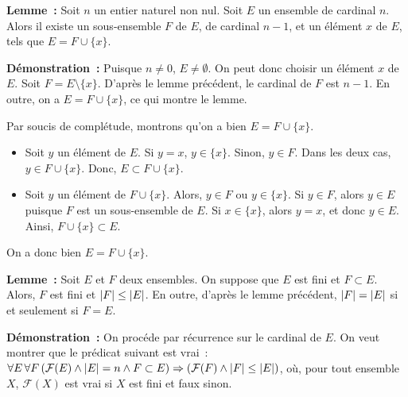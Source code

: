     \done 

\medskip

\noindent\textbf{Lemme :} Soit $n$ un entier naturel non nul. 
    Soit $E$ un ensemble de cardinal $n$. 
    Alors il existe un sous-ensemble $F$ de $E$, de cardinal $n-1$, et un élément $x$ de $E$, tels que $E = F \cup \lbrace x \rbrace$.

\medskip

\noindent\textbf{Démonstration :} Puisque $n \neq 0$, $E \neq \emptyset$. 
    On peut donc choisir un élément $x$ de $E$. 
    Soit $F = E \setminus \lbrace x \rbrace$. 
    D'après le lemme précédent, le cardinal de $F$ est $n-1$. 
    En outre, on a $E = F \cup \lbrace x \rbrace$, ce qui montre le lemme. 

    Par soucis de complétude, montrons qu'on a bien $E = F \cup \lbrace x \rbrace$. 
    \begin{itemize}[nosep]
        \item Soit $y$ un élément de $E$. 
            Si $y = x$, $y \in \lbrace x \rbrace$.
            Sinon, $y \in F$. 
            Dans les deux cas, $y \in F \cup \lbrace x \rbrace$. 
            Donc, $E \subset F \cup \lbrace x \rbrace$.
        \item Soit $y$ un élément de $F \cup \lbrace x \rbrace$. 
            Alors, $y \in F$ ou $y \in \lbrace x \rbrace$.
            Si $y \in F$, alors $y \in E$ puisque $F$ est un sous-ensemble de $E$.
            Si $x \in \lbrace x \rbrace$, alors $y = x$, et donc $y \in E$. 
            Ainsi, $F \cup \lbrace x \rbrace \subset E$.
    \end{itemize}
    On a donc bien $E = F \cup \lbrace x \rbrace$.

    \done

    \medskip

\medskip

\noindent\textbf{Lemme :} Soit $E$ et $F$ deux ensembles. 
    On suppose que $E$ est fini et $F \subset E$.
    Alors, $F$ est fini et $\left\lvert F \right\rvert \leq \left\lvert E \right\rvert$.
    En outre, d'après le lemme précédent, $\left\lvert F \right\rvert = \left\lvert E \right\rvert$ si et seulement si $F = E$.

\medskip

\noindent\textbf{Démonstration :} 
    On procéde par récurrence sur le cardinal de $E$. 
    On veut montrer que le prédicat suivant est vrai : $\forall E \, \forall F \, (\mathcal{F}(E) \wedge \left\lvert E \right\rvert = n \wedge F \subset E) \Rightarrow (\mathcal{F}(F) \wedge \left\lvert F \right\rvert \leq \left\lvert E \right\rvert)$, où, pour tout ensemble $X$, $\mathcal{F}(X)$ est vrai si $X$ est fini et faux sinon.

